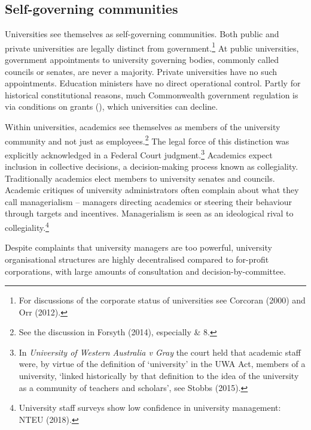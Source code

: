 \documentclass{grattan}
\begin{document}
%
\subsection{Self-governing communities}\label{subsec:self-governing-communities}

Universities see themselves as self-governing communities. Both public and private universities are legally distinct from government.\footnote{For discussions of the corporate status of universities see Corcoran (2000) and Orr (2012).} At public universities, government appointments to university governing bodies, commonly called councils or senates, are never a majority. Private universities have no such appointments. Education ministers have no direct operational control. Partly for historical constitutional reasons, much Commonwealth government regulation is via conditions on grants (), which universities can decline.

Within universities, academics see themselves as members of the university community and not just as employees.\footnote{See the discussion in Forsyth (2014), especially  \& 8.} The legal force of this distinction was explicitly acknowledged in a Federal Court judgment.\footnote{In \emph{University of Western Australia v Gray} the court held that academic staff were, by virtue of the definition of `university' in the UWA Act, members of a university, `linked historically by that definition to the idea of the university as a community of teachers and scholars', see Stobbs (2015).} Academics expect inclusion in collective decisions, a decision-making process known as collegiality. Traditionally academics elect members to university senates and councils. Academic critiques of university administrators often complain about what they call managerialism -- managers directing academics or steering their behaviour through targets and incentives. Managerialism is seen as an ideological rival to collegiality.\footnote{University staff surveys show low confidence in university management: NTEU (2018).}

Despite complaints that university managers are too powerful, university organisational structures are highly decentralised compared to for-profit corporations, with large amounts of consultation and decision-by-committee.
\end{document}
